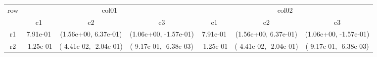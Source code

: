 \begin{tabular}{ccccccc}
\toprule
\multirow{2}{*}{row}&\multicolumn{3}{c}{col01}&\multicolumn{3}{c}{col02}\tabularnewline
\cmidrule(lr){2-4}
\cmidrule(lr){5-7}
&c1&c2&c3&c1&c2&c3\tabularnewline
\midrule
r1&7.91e-01& (1.56e+00, 6.37e-01)& (1.06e+00, -1.57e-01)&7.91e-01& (1.56e+00, 6.37e-01)& (1.06e+00, -1.57e-01)\tabularnewline
r2&-1.25e-01& (-4.41e-02, -2.04e-01)& (-9.17e-01, -6.38e-03)&-1.25e-01& (-4.41e-02, -2.04e-01)& (-9.17e-01, -6.38e-03)\tabularnewline
\bottomrule
\end{tabular}
